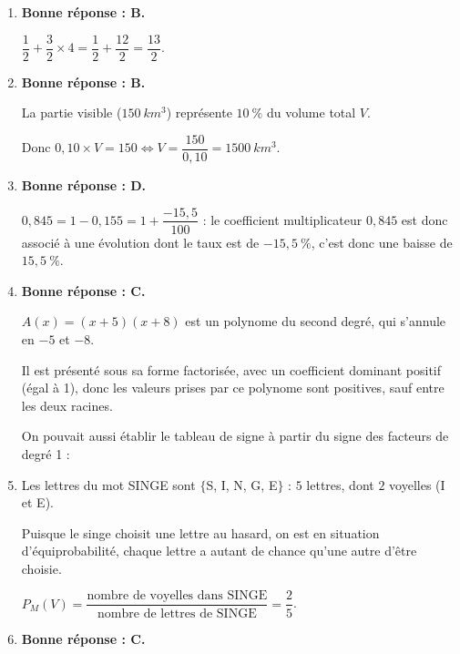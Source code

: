 \documentclass[10pt]{article}
\providecommand{\np}[2][]{{#2~#1}}
\begin{document}
	\begin{enumerate}
		\item \textbf{Bonne réponse : B.}

		$\dfrac{1}{2}+\dfrac{3}{2}\times 4= \dfrac{1}{2}+\dfrac{12}{2}=\dfrac{13}{2}$.

		\item \textbf{Bonne réponse : B.}

		La partie visible ($\np[km^3]{150}$) représente $10~\%$ du volume total $V$.

		Donc \quad $0,10 \times V = 150 \iff V=\dfrac{150}{0,10}=\np[km^3]{1500}$.

		\item \textbf{Bonne réponse : D.}

		$0,845=1-0,155 = 1 + \dfrac{-15,5}{100}$ : le coefficient multiplicateur $0,845$ est donc associé à une évolution dont le taux est de $-15,5~\%$, c'est donc une baisse de $15,5~\%$.

		\item \textbf{Bonne réponse : C.}

		$A(x)=(x+5)(x+8)$ est un polynome du second degré, qui s'annule en $-5$ et $-8$.

		Il est présenté sous sa forme factorisée, avec un coefficient dominant positif (égal à 1), donc les valeurs prises par ce polynome sont positives, sauf entre les deux racines.

		On pouvait aussi établir le tableau de signe à partir du signe des facteurs de degré 1 :

		\begin{center}
		\end{center}

		\item Les lettres du mot SINGE sont $\{$S, I, N, G, E$\}$ : $5$ lettres, dont $2$ voyelles (I et E).

		Puisque le singe choisit une lettre au hasard, on est en situation d'équiprobabilité, chaque lettre a autant de chance qu'une autre d'être choisie.

		$P_{M}(V)=\dfrac{\text{nombre de voyelles dans SINGE}}{\text{nombre de lettres de SINGE}}=\dfrac{2}{5}$.

		\item \textbf{Bonne réponse : C.}


\end{enumerate}
\end{document}
